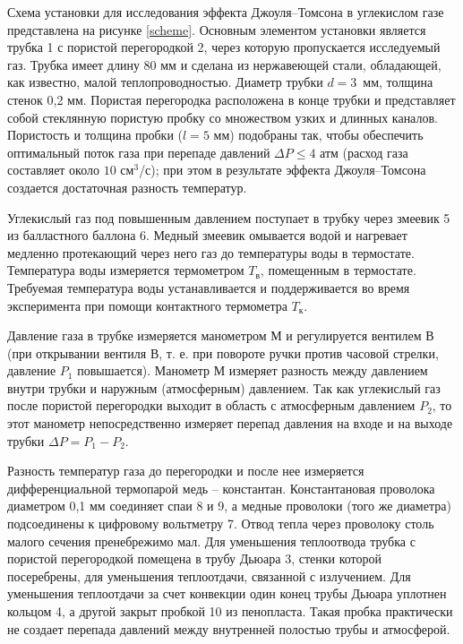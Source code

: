 \documentclass[a4paper, 12pt]{article}
\begin{document}
Схема установки для исследования эффекта Джоуля–Томсона в углекислом газе представлена на рисунке \ref{scheme}. Основным элементом установки является трубка 1 с пористой перегородкой 2, через которую пропускается исследуемый газ. Трубка имеет длину 80 мм и сделана из нержавеющей стали, обладающей, как известно, малой теплопроводностью. Диаметр трубки $ d = 3 $~мм, толщина стенок 0,2 мм. Пористая перегородка расположена в конце трубки и представляет собой стеклянную пористую пробку со множеством узких и длинных каналов. Пористость и толщина пробки ($ l = 5 $ мм) подобраны так, чтобы обеспечить оптимальный поток газа при перепаде давлений $ \Delta P \leqslant 4 $ атм (расход газа составляет около $ 10 $ см$ ^3 $/с); при этом в результате эффекта Джоуля–Томсона создается достаточная разность температур.

Углекислый газ под повышенным давлением поступает в трубку через змеевик 5 из балластного баллона 6. Медный змеевик омывается водой и нагревает медленно протекающий через него газ до температуры воды в термостате. Температура воды измеряется термометром $ T_\text{в} $, помещенным в термостате. Требуемая температура воды устанавливается и поддерживается во время эксперимента при помощи контактного термометра $ T_\text{к} $.

Давление газа в трубке измеряется манометром М и регулируется вентилем В (при открывании вентиля В, т. е. при повороте ручки против часовой стрелки, давление $ P_1 $ повышается). Манометр М измеряет разность между давлением внутри трубки и наружным (атмосферным) давлением. Так как углекислый газ после пористой перегородки выходит в область с атмосферным давлением $ P_2 $, то этот манометр непосредственно измеряет перепад давления на входе и на выходе трубки $ \Delta P = P_1 - P_2 $.

Разность температур газа до перегородки и после нее измеряется дифференциальной термопарой медь -- константан. Константановая проволока диаметром 0,1 мм соединяет спаи 8 и 9, а медные проволоки (того же диаметра) подсоединены к цифровому вольтметру 7. Отвод тепла через проволоку столь малого сечения пренебрежимо мал. Для уменьшения теплоотвода трубка с пористой перегородкой помещена в трубу Дьюара 3, стенки которой посеребрены, для уменьшения теплоотдачи, связанной с излучением. Для уменьшения теплоотдачи за счет конвекции один конец трубы Дьюара уплотнен кольцом 4, а другой закрыт пробкой 10 из пенопласта. Такая пробка практически не создает перепада давлений между внутренней полостью трубы и атмосферой.
\end{document}
